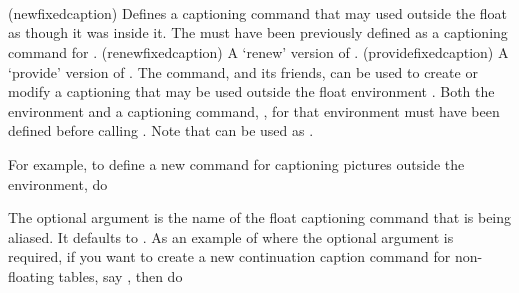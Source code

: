 
\begin{syntax}
\cmd{\newfixedcaption} \\
\cmd{\renewfixedcaption} \\
\cmd{\providefixedcaption} \\
\end{syntax}
\glossary(newfixedcaption)%
  {}%
  {Defines a captioning command  that may used outside the
    float as though it was inside it. The 
  must have been previously defined as a captioning command for .}
\glossary(renewfixedcaption)%
  {}%
  {A `renew' version of .}
\glossary(providefixedcaption)%
  {}%
  {A `provide' version of .}
 The \cmd{\newfixedcaption} command, and its friends, can be used 
to create or modify a captioning  that may be used 
outside the float environment .
Both the environment  and a captioning command, 
, for that environment must have been defined before
calling \cmd{\newfixedcaption}. Note that \cmd{\namedlegend} can be used
as .

 For example, to define a new  command for captioning pictures
 outside the  environment, do
\begin{lcode}
\end{lcode}
 The optional  argument is the name of the float
captioning command that is being aliased. It defaults to \cmd{\caption}.
As an example of where the optional argument is required, if you
want to create a new continuation 
caption command for non-floating
tables, say , then do
\begin{lcode}
\end{lcode}

